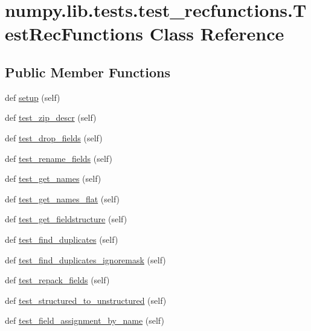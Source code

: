 \hypertarget{classnumpy_1_1lib_1_1tests_1_1test__recfunctions_1_1TestRecFunctions}{}\section{numpy.\+lib.\+tests.\+test\+\_\+recfunctions.\+Test\+Rec\+Functions Class Reference}
\label{classnumpy_1_1lib_1_1tests_1_1test__recfunctions_1_1TestRecFunctions}
\subsection*{Public Member Functions}
\begin{DoxyCompactItemize}
\item 
def \hyperlink{classnumpy_1_1lib_1_1tests_1_1test__recfunctions_1_1TestRecFunctions_ac3d7cfbe3be78e568174a8797654bfad}{setup} (self)
\item 
def \hyperlink{classnumpy_1_1lib_1_1tests_1_1test__recfunctions_1_1TestRecFunctions_a9d233b90174295ed97c1991ff1c30ada}{test\+\_\+zip\+\_\+descr} (self)
\item 
def \hyperlink{classnumpy_1_1lib_1_1tests_1_1test__recfunctions_1_1TestRecFunctions_adf1052b4a15dfe35dd19ac4af34c8812}{test\+\_\+drop\+\_\+fields} (self)
\item 
def \hyperlink{classnumpy_1_1lib_1_1tests_1_1test__recfunctions_1_1TestRecFunctions_ae2b1ea20c4c950c6991a009b4e9d4167}{test\+\_\+rename\+\_\+fields} (self)
\item 
def \hyperlink{classnumpy_1_1lib_1_1tests_1_1test__recfunctions_1_1TestRecFunctions_ae65aeeb30242b6ab092e4652b857a40a}{test\+\_\+get\+\_\+names} (self)
\item 
def \hyperlink{classnumpy_1_1lib_1_1tests_1_1test__recfunctions_1_1TestRecFunctions_adfc155f0691f6c3652defb8a2fe57211}{test\+\_\+get\+\_\+names\+\_\+flat} (self)
\item 
def \hyperlink{classnumpy_1_1lib_1_1tests_1_1test__recfunctions_1_1TestRecFunctions_a8aa93f6431d00d8d63df8c9afa39d2c4}{test\+\_\+get\+\_\+fieldstructure} (self)
\item 
def \hyperlink{classnumpy_1_1lib_1_1tests_1_1test__recfunctions_1_1TestRecFunctions_a7a0c86c6b67b092b58a305a0817e9bdf}{test\+\_\+find\+\_\+duplicates} (self)
\item 
def \hyperlink{classnumpy_1_1lib_1_1tests_1_1test__recfunctions_1_1TestRecFunctions_aeb71dfe77ae99eb81b67e8db9b6669cb}{test\+\_\+find\+\_\+duplicates\+\_\+ignoremask} (self)
\item 
def \hyperlink{classnumpy_1_1lib_1_1tests_1_1test__recfunctions_1_1TestRecFunctions_aec5dd4fcfecca2321c3684875e31185a}{test\+\_\+repack\+\_\+fields} (self)
\item 
def \hyperlink{classnumpy_1_1lib_1_1tests_1_1test__recfunctions_1_1TestRecFunctions_aca208feb0d88465d30ef714bf9dc29ea}{test\+\_\+structured\+\_\+to\+\_\+unstructured} (self)
\item 
def \hyperlink{classnumpy_1_1lib_1_1tests_1_1test__recfunctions_1_1TestRecFunctions_a6b9d0287f22cb3d9e03f9847dbc3e495}{test\+\_\+field\+\_\+assignment\+\_\+by\+\_\+name} (self)
\end{DoxyCompactItemize}
